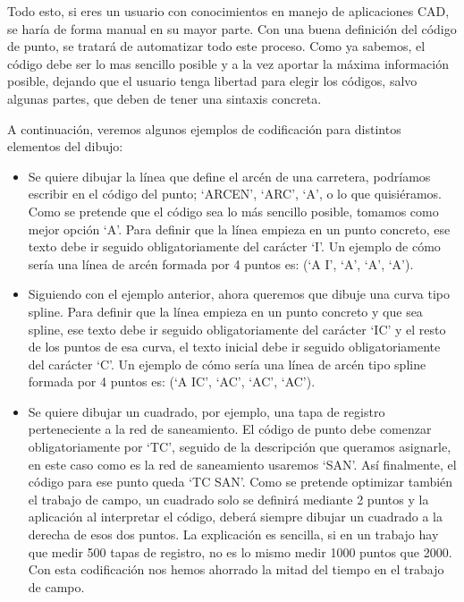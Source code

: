 Todo esto, si eres un usuario con conocimientos en manejo de aplicaciones CAD, se haría de forma manual en su mayor parte. Con una buena definición del código de punto, se tratará de automatizar todo este proceso.
Como ya sabemos, el código debe ser lo mas sencillo posible y a la vez aportar la máxima información posible, dejando que el usuario tenga libertad para elegir los códigos, salvo algunas partes, que deben de tener una sintaxis concreta. 

A continuación, veremos algunos ejemplos de codificación para distintos elementos del dibujo:

\begin{itemize}

\item Se quiere dibujar la línea que define el arcén de una carretera, podríamos escribir en el código del punto; ‘ARCEN’, ‘ARC’, ‘A’, o lo que quisiéramos. Como se pretende que el código sea lo más sencillo posible, tomamos como mejor opción ‘A’. Para definir que la línea empieza en un punto concreto, ese texto debe ir seguido obligatoriamente del carácter ‘I’. Un ejemplo de cómo sería una línea de arcén formada por 4 puntos es: (‘A I’, ‘A’, ‘A’, ‘A’).


\item Siguiendo con el ejemplo anterior, ahora queremos que dibuje una curva tipo spline. Para definir que la línea empieza en un punto concreto y que sea spline, ese texto debe ir seguido obligatoriamente del carácter ‘IC’ y el resto de los puntos de esa curva, el texto inicial debe ir seguido obligatoriamente del carácter ‘C’. Un ejemplo de cómo sería una línea de arcén tipo spline formada por 4 puntos es: (‘A IC’, ‘AC’, ‘AC’, ‘AC’).

\item Se quiere dibujar un cuadrado, por ejemplo, una tapa de registro perteneciente a la red de saneamiento. El código de punto debe comenzar obligatoriamente por ‘TC’, seguido de la descripción que queramos asignarle, en este caso como es la red de saneamiento usaremos ‘SAN’. Así finalmente, el código para ese punto queda ‘TC SAN’. Como se pretende optimizar también el trabajo de campo, un cuadrado solo se definirá mediante 2 puntos y la aplicación al interpretar el código, deberá siempre dibujar un cuadrado a la derecha de esos dos puntos. La explicación es sencilla, si en un trabajo hay que medir 500 tapas de registro, no es lo mismo medir 1000 puntos que 2000. Con esta codificación nos hemos ahorrado la mitad del tiempo en el trabajo de campo.


\end{itemize}
